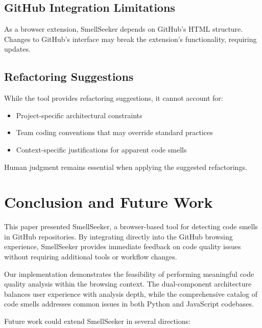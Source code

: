 \documentclass[sigconf,screen]{acmart}
\begin{document}
\subsection{GitHub Integration Limitations}

As a browser extension, SmellSeeker depends on GitHub's HTML structure. Changes to GitHub's interface may break the extension's functionality, requiring updates.

\subsection{Refactoring Suggestions}

While the tool provides refactoring suggestions, it cannot account for:

\begin{itemize}
    \item Project-specific architectural constraints
    \item Team coding conventions that may override standard practices
    \item Context-specific justifications for apparent code smells
\end{itemize}

Human judgment remains essential when applying the suggested refactorings.

\section{Conclusion and Future Work}

This paper presented SmellSeeker, a browser-based tool for detecting code smells in GitHub repositories. By integrating directly into the GitHub browsing experience, SmellSeeker provides immediate feedback on code quality issues without requiring additional tools or workflow changes.

Our implementation demonstrates the feasibility of performing meaningful code quality analysis within the browsing context. The dual-component architecture balances user experience with analysis depth, while the comprehensive catalog of code smells addresses common issues in both Python and JavaScript codebases.

Future work could extend SmellSeeker in several directions:
\end{document}
